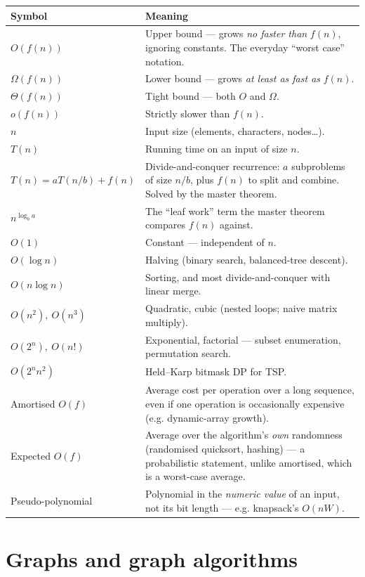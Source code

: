 \documentclass[10pt,letterpaper,onecolumn]{article}
\makeatletter
\newenvironment{symtab}
  {\begin{longtable}{@{}>{\raggedright\arraybackslash}p{0.26\textwidth}%
                       >{\raggedright\arraybackslash}p{0.70\textwidth}@{}}
   \toprule
   \textbf{Symbol} & \textbf{Meaning} \\
   \midrule
   \endhead
   \bottomrule
   \endfoot}
  {\end{longtable}}
\makeatother
\begin{document}
\begin{symtab}
$O(f(n))$ & Upper bound — grows \emph{no faster than} $f(n)$, ignoring constants. The everyday ``worst case'' notation. \\
$\Omega(f(n))$ & Lower bound — grows \emph{at least as fast as} $f(n)$. \\
$\Theta(f(n))$ & Tight bound — both $O$ and $\Omega$. \\
$o(f(n))$ & Strictly slower than $f(n)$. \\
$n$ & Input size (elements, characters, nodes\dots). \\
$T(n)$ & Running time on an input of size $n$. \\
$T(n)=aT(n/b)+f(n)$ & Divide-and-conquer recurrence: $a$ subproblems of size $n/b$, plus $f(n)$ to split and combine. Solved by the master theorem. \\
$n^{\log_b a}$ & The ``leaf work'' term the master theorem compares $f(n)$ against. \\
$O(1)$ & Constant — independent of $n$. \\
$O(\log n)$ & Halving (binary search, balanced-tree descent). \\
$O(n\log n)$ & Sorting, and most divide-and-conquer with linear merge. \\
$O(n^2),\ O(n^3)$ & Quadratic, cubic (nested loops; naive matrix multiply). \\
$O(2^n),\ O(n!)$ & Exponential, factorial — subset enumeration, permutation search. \\
$O(2^n n^2)$ & Held--Karp bitmask DP for TSP. \\
Amortised $O(f)$ & Average cost per operation over a long sequence, even if one operation is occasionally expensive (e.g. dynamic-array growth). \\
Expected $O(f)$ & Average over the algorithm's \emph{own} randomness (randomised quicksort, hashing) — a probabilistic statement, unlike amortised, which is a worst-case average. \\
Pseudo-polynomial & Polynomial in the \emph{numeric value} of an input, not its bit length — e.g. knapsack's $O(nW)$. \\
\end{symtab}

\section{Graphs and graph algorithms}
\end{document}
